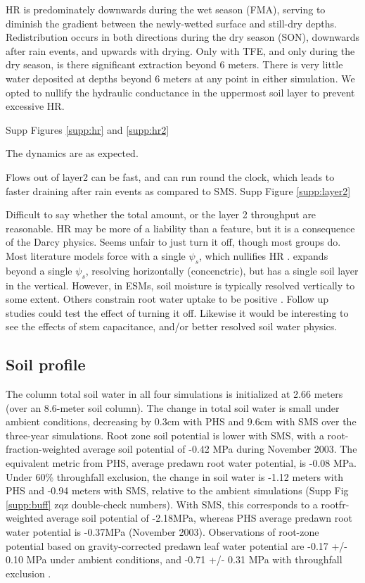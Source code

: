 \documentclass[draft,linenumbers]{agujournal}
\begin{document}
HR is predominately downwards during the wet season (FMA), serving to diminish the gradient between the newly-wetted surface and still-dry depths.
Redistribution occurs in both directions during the dry season (SON), downwards after rain events, and upwards with drying.
Only with TFE, and only during the dry season, is there significant extraction beyond 6 meters.
There is very little water deposited at depths beyond 6 meters at any point in either simulation.
We opted to nullify the hydraulic conductance in the uppermost soil layer to prevent excessive HR.


Supp Figures \ref{supp:hr} and \ref{supp:hr2}

The dynamics are as expected.

Flows out of layer2 can be fast, and can run round the clock, which leads to faster draining after rain events as compared to SMS.
Supp Figure \ref{supp:layer2}

Difficult to say whether the total amount, or the layer 2 throughput are reasonable.
HR may be more of a liability than a feature, but it is a consequence of the Darcy physics.
Seems unfair to just turn it off, though most groups do.
Most literature models force with a single $\psi_s$, which nullifies HR \citep{fisher2007,bonan2014,sperry2017}.
\cite{christoffersen2016} expands beyond a single $\psi_s$, resolving horizontally (concenctric), but has a single soil layer in the vertical.
However, in ESMs, soil moisture is typically resolved vertically to some extent.
Others constrain root water uptake to be positive \citep{xu2016}.
Follow up studies could test the effect of turning it off.
Likewise it would be interesting to see the effects of stem capacitance, and/or better resolved soil water physics.


\subsection{Soil profile}
The column total soil water in all four simulations is initialized at 2.66 meters (over an 8.6-meter soil column).
The change in total soil water is small under ambient conditions, decreasing by 0.3cm with PHS and 9.6cm with SMS over the three-year simulations.
Root zone soil potential is lower with SMS, with a root-fraction-weighted average soil potential of -0.42 MPa during November 2003.
The equivalent metric from PHS, average predawn root water potential, is -0.08 MPa.
Under 60\% throughfall exclusion, the change in soil water is -1.12 meters with PHS and -0.94 meters with SMS, relative to the ambient simulations (Supp Fig \ref{supp:buff} zqz double-check numbers).
With SMS, this corresponds to a rootfr-weighted average soil potential of -2.18MPa, whereas 
PHS average predawn root water potential is -0.37MPa (November 2003).
Observations of root-zone potential based on gravity-corrected predawn leaf water potential are -0.17 +/- 0.10 MPa under ambient conditions, and -0.71 +/- 0.31 MPa with throughfall exclusion \citep{fisher2007}.
\end{document}
